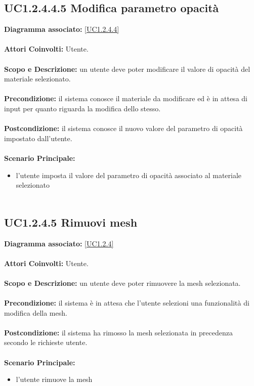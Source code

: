 \subsection{UC1.2.4.4.5 Modifica parametro opacità}
\textbf{Diagramma associato:}
\ref{UC1.2.4.4} \\ \\
\textbf{Attori Coinvolti:}
Utente. \\ \\
\textbf{Scopo e Descrizione:}
un utente deve poter modificare il valore di opacità del materiale selezionato. \\ \\
\textbf{Precondizione:}
il sistema conosce il materiale da modificare ed è in attesa di input per quanto riguarda la modifica dello stesso. \\ \\
\textbf{Postcondizione:}
il sistema conosce il nuovo valore del parametro di opacità impostato dall'utente. \\ \\
\textbf{Scenario Principale:}
\begin{itemize}
\item l'utente imposta il valore del parametro di opacità associato al materiale selezionato
\\ \\ \end{itemize}


\subsection{UC1.2.4.5 Rimuovi mesh}
\textbf{Diagramma associato:}
\ref{UC1.2.4} \\ \\
\textbf{Attori Coinvolti:}
Utente. \\ \\
\textbf{Scopo e Descrizione:}
un utente deve poter rimuovere la mesh selezionata. \\ \\
\textbf{Precondizione:}
il sistema è in attesa che l'utente selezioni una funzionalità di modifica della mesh. \\ \\
\textbf{Postcondizione:}
il sistema ha rimosso la mesh selezionata in precedenza secondo le richieste utente. \\ \\
\textbf{Scenario Principale:}
\begin{itemize}
\item l'utente rimuove la mesh
\\ \\ \end{itemize}


